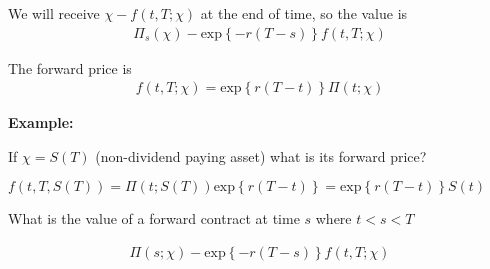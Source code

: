 \noindent We will receive $\chi-f(t,T;\chi)$ at the end of time, so the value is 
\begin{equation*}
  \begin{gathered}
    \Pi_s(\chi)-\text{exp}\left\{-r(T-s)\right\}f(t,T;\chi)
  \end{gathered}
\end{equation*}
\par\bigskip
\begin{lem}[]{}
  The forward price is
  \begin{equation*}
    \begin{gathered}
      f(t,T;\chi) = \text{exp}\left\{r(T-t)\right\}\Pi(t;\chi)
    \end{gathered}
  \end{equation*}
\end{lem}
\par\bigskip
\noindent\textbf{Example:}\par
\noindent If $\chi = S(T)$ (non-dividend paying asset) what is its forward price?\par
\noindent $f(t,T,S(T)) = \Pi(t;S(T))\text{exp}\left\{r(T-t)\right\} =\text{exp}\left\{r(T-t)\right\}S(t)$
\par\bigskip
\noindent What is the value of a forward contract at time $s$ where $t<s<T$\par
\begin{equation*}
  \begin{gathered}
    \Pi(s;\chi)-\text{exp}\left\{-r(T-s)\right\}f(t,T;\chi)
  \end{gathered}
\end{equation*}
\par\bigskip
